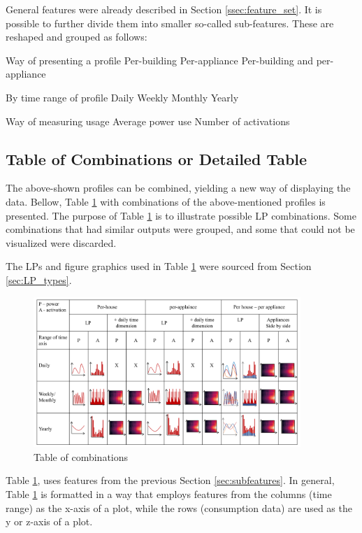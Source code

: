 General features were already described in Section \ref{ssec:feature_set}.
It is possible to further divide them into smaller so-called sub-features.
These are reshaped and grouped as follows:
\begin{outline}

\1 Way of presenting a profile
\2 Per-building 
\2 Per-appliance 
\2 Per-building and per-appliance

\1 By time range of profile 
\2 Daily
\2 Weekly
\2 Monthly
\2 Yearly

\1 Way of measuring usage
\2 Average power use 
\2 Number of activations
\end{outline}


\subsection{Table of Combinations or Detailed Table}
\label{ssec:table_of_combinations}
The above-shown profiles can be combined, yielding a new way of displaying the data.
Bellow, Table \ref{fig:map_fig} with combinations of the above-mentioned profiles is presented. 
The purpose of Table \ref{fig:map_fig} is to illustrate possible LP combinations.
Some combinations that had similar outputs were grouped, and some that could not be visualized were discarded. 

The LPs and figure graphics used in Table \ref{fig:map_fig} were sourced from Section \ref{sec:LP_types}.

\begin{figure}
	\centering
	\includegraphics[width=0.9\textwidth]{Figures/profile_sketches/slide14.pdf}
  \caption{Table of combinations}
  \label{fig:map_fig}
\end{figure}

Table \ref{fig:map_fig}, uses features from the previous Section \ref{sec:subfeatures}. 
In general, Table \ref{fig:map_fig} is formatted in a way that employs features from the columns (time range) as the x-axis of a plot,
while the rows (consumption data) are used as the y or z-axis of a plot.


